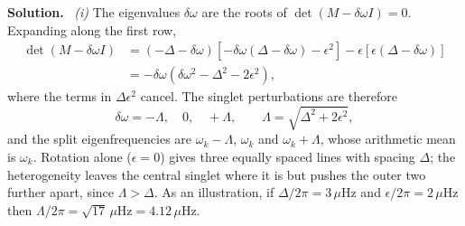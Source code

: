\documentclass[a4paper,12pt]{paper}
\newenvironment{solution}{\par\noindent\textbf{Solution.}\ }{\par\medskip}
\begin{document}
\begin{solution}
\textit{(i)} The eigenvalues $\delta\omega$ are the roots of $\det(M-\delta\omega I)=0$.
Expanding along the first row,
\begin{align}
\det(M-\delta\omega I)&=(-\Delta-\delta\omega)\left[-\delta\omega(\Delta-\delta\omega)-\epsilon^{2}\right]
-\epsilon\left[\epsilon(\Delta-\delta\omega)\right]\nonumber\\
&=-\delta\omega\left(\delta\omega^{2}-\Delta^{2}-2\epsilon^{2}\right),
\label{eq:15}
\end{align}
where the terms in $\Delta\epsilon^{2}$ cancel. The singlet perturbations are therefore
\begin{equation}
\delta\omega=-\Lambda,\quad 0,\quad +\Lambda,\qquad \Lambda=\sqrt{\Delta^{2}+2\epsilon^{2}},
\label{eq:16}
\end{equation}
and the split eigenfrequencies are $\omega_{k}-\Lambda$, $\omega_{k}$ and $\omega_{k}+\Lambda$,
whose arithmetic mean is $\omega_{k}$. Rotation alone ($\epsilon=0$) gives three equally spaced
lines with spacing $\Delta$; the heterogeneity leaves the central singlet where it is but
pushes the outer two further apart, since $\Lambda>\Delta$. As an illustration, if
$\Delta/2\pi=3\,\mu\mathrm{Hz}$ and $\epsilon/2\pi=2\,\mu\mathrm{Hz}$ then
$\Lambda/2\pi=\sqrt{17}\,\mu\mathrm{Hz}=4.12\,\mu\mathrm{Hz}$.


\end{solution}
\end{document}

